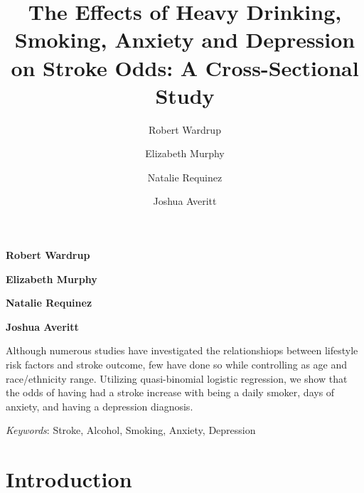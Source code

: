 \documentclass[11pt,]{article}
\title{The Effects of Heavy Drinking, Smoking, Anxiety and Depression on Stroke
Odds: A Cross-Sectional Study  }
\author{\Large Robert Wardrup\vspace{0.05in} \newline\normalsize\emph{}   \and \Large Elizabeth Murphy\vspace{0.05in} \newline\normalsize\emph{}   \and \Large Natalie Requinez\vspace{0.05in} \newline\normalsize\emph{}   \and \Large Joshua Averitt\vspace{0.05in} \newline\normalsize\emph{}  }
\date{}
\newcommand*{\authorfont}{\fontfamily{phv}\selectfont}
\renewenvironment{abstract}
 {{%
    \setlength{\leftmargin}{0mm}
    \setlength{\rightmargin}{\leftmargin}%
  }%
  \relax}
 {\endlist}
\begin{document}
	
%

{%
\setlength{\parindent}{0pt}
\thispagestyle{plain}
{\fontsize{18}{20}\selectfont\raggedright 
\maketitle  %

}

{
   \vskip 13.5pt\relax \normalsize\fontsize{11}{12} 
\textbf{\authorfont Robert Wardrup} \hskip 15pt \emph{\small }   \par \textbf{\authorfont Elizabeth Murphy} \hskip 15pt \emph{\small }   \par \textbf{\authorfont Natalie Requinez} \hskip 15pt \emph{\small }   \par \textbf{\authorfont Joshua Averitt} \hskip 15pt \emph{\small }   

}

}








\begin{abstract}

    \hbox{\vrule height .2pt width 39.14pc}

    \vskip 8.5pt %

\noindent Although numerous studies have investigated the relationshiops between
lifestyle risk factors and stroke outcome, few have done so while
controlling as age and race/ethnicity range. Utilizing quasi-binomial
logistic regression, we show that the odds of having had a stroke
increase with being a daily smoker, days of anxiety, and having a
depression diagnosis.


\vskip 8.5pt \noindent \emph{Keywords}: Stroke, Alcohol, Smoking, Anxiety, Depression \par

    \hbox{\vrule height .2pt width 39.14pc}



\end{abstract}


\vskip 6.5pt


\noindent  \section{Introduction}\label{introduction}
\end{document}
